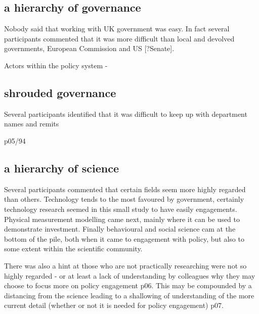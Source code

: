 \subsection{a hierarchy of governance}
Nobody said that working with UK government was easy. In fact several participants commented that it was more difficult than local and devolved governments, European Commission and US [?Senate]. 

Actors within the policy system - 

\subsection{shrouded governance}

Several participants identified that it was difficult to keep up with department names and remits 


p05/94

\subsection{a hierarchy of science}
Several participants commented that certain fields seem more highly regarded than others. Technology tends to the most favoured by government, certainly technology research seemed in this small study to have easily engagements. Physical measurement modelling came next, mainly where it can be used to demonstrate investment. Finally behavioural and social science cam at the bottom of the pile, both when it came to engagement with policy, but also to some extent within the scientific community.

There was also a hint at those who are not practically researching were not so highly regarded - or at least a lack of understanding by colleagues why they may choose to focus more on policy engagement p06. This may be compounded by a distancing from the science leading to a shallowing of understanding of the more current detail (whether or not it is needed for policy engagement) p07. 


